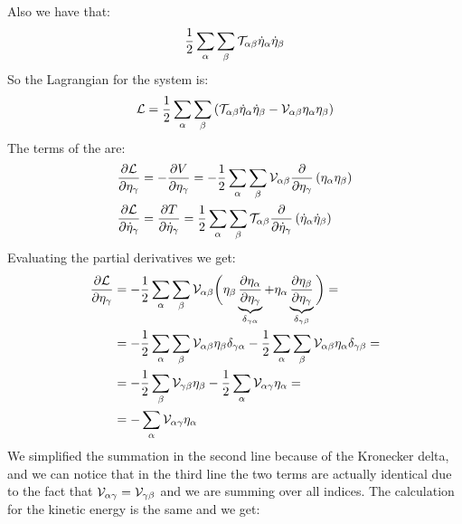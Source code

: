 Also we have that:
\begin{equation}
    \dfrac{1}{2}\displaystyle\sum_{\alpha}\displaystyle\sum_{\beta}\mathcal{T}_{\alpha \beta}\dot{\eta}_{\alpha}\dot{\eta}_{\beta}
\end{equation}
So the Lagrangian for the system is:
\begin{equation}
    \mathcal{L} = \dfrac{1}{2}\displaystyle\sum_{\alpha}\displaystyle\sum_{\beta}\left(\mathcal{T}_{\alpha \beta}\dot{\eta}_{\alpha}\dot{\eta}_{\beta} - \mathcal{V}_{\alpha \beta}\eta_{\alpha}\eta_{\beta}\right)
\end{equation}
The terms of the \eleref\;are:
\begin{equation}
    \begin{split}
        \dfrac{\partial \mathcal{L}}{\partial \eta_{\gamma}} &= -\dfrac{\partial V}{\partial \eta_{\gamma}} = -\dfrac{1}{2}\displaystyle\sum_{\alpha}\displaystyle\sum_{\beta}\mathcal{V}_{\alpha \beta} \dfrac{\partial }{\partial \eta_{\gamma}}\left(\eta_{\alpha}\eta_{\beta}\right)\\
        \dfrac{\partial \mathcal{L}}{\partial \dot{\eta}_{\gamma}} &= \dfrac{\partial T}{\partial \dot{\eta}_{\gamma}} = \dfrac{1}{2}\displaystyle\sum_{\alpha}\displaystyle\sum_{\beta}\mathcal{T}_{\alpha \beta}\dfrac{\partial }{\partial \dot{\eta}_{\gamma}}\left(\dot{\eta}_{\alpha}\dot{\eta}_{\beta}\right)
    \end{split}
\end{equation}
Evaluating the partial derivatives we get:
\begin{equation}
    \begin{split}
        \dfrac{\partial \mathcal{L}}{\partial \eta_{\gamma}} &= -\dfrac{1}{2}\displaystyle\sum_{\alpha}\displaystyle\sum_{\beta}\mathcal{V}_{\alpha \beta} \bigg(\eta_{\beta}\underbrace{\dfrac{\partial \eta_{\alpha}}{\partial \eta_{\gamma}}}_{\delta_{\gamma \alpha}} + \eta_{\alpha}\underbrace{\dfrac{\partial \eta_{\beta}}{\partial \eta_{\gamma}}}_{\delta_{\gamma \beta}}\bigg) =\\
        &= -\dfrac{1}{2}\displaystyle\sum_{\alpha}\displaystyle\sum_{\beta}\mathcal{V}_{\alpha \beta} \eta_{\beta}\delta_{\gamma \alpha} - \dfrac{1}{2}\displaystyle\sum_{\alpha}\displaystyle\sum_{\beta}\mathcal{V}_{\alpha \beta} \eta_{\alpha}\delta_{\gamma \beta} = \\
        &= -\dfrac{1}{2}\displaystyle\sum_{\beta}\mathcal{V}_{\gamma \beta} \eta_{\beta} - \dfrac{1}{2}\displaystyle\sum_{\alpha}\mathcal{V}_{\alpha \gamma} \eta_{\alpha} =\\
        &= -\displaystyle\sum_{\alpha}\mathcal{V}_{\alpha \gamma} \eta_{\alpha}
    \end{split}
\end{equation}
We simplified the summation in the second line because of the Kronecker delta, and we can notice that in the third line the two terms are actually identical due to the fact that $\mathcal{V}_{\alpha \gamma} = \mathcal{V}_{\gamma \beta}$ and we are summing over all indices. The calculation for the kinetic energy is the same and we get:
